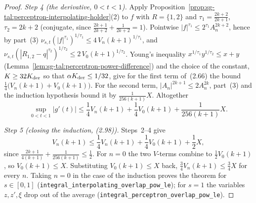 \begin{proof}
\emph{Step 4 (the derivative, $0<t<1$).} Apply Proposition~\ref{prop:sg-tal:perceptron-interpolating-holder}(2) to
$f$ with $R=\{1,2\}$ and $\tau_1=\frac{2k+2}{2k+1}$, $\tau_2=2k+2$ (conjugate, since
$\frac{2k+1}{2k+2}+\frac1{2k+2}=1$). Pointwise $|f|^{\tau_1}\le 2^{\tau_1}A_n^{2k+2}$, hence by part~(3)
$\nu_{s,t}(|f|^{\tau_1})^{1/\tau_1}\le 4\,V_n(k+1)^{1/\tau_1}$, and
$\nu_{s,t}(|R_{1,2}-q|^{\tau_2})^{1/\tau_2}\le 2\,V_0(k+1)^{1/\tau_2}$. Young's inequality
$x^{1/\tau_1}y^{1/\tau_2}\le x+y$ (Lemma~\ref{lem:sg-tal:perceptron-power-difference}) and the choice of the
constant, $K\ge 32K_{\rm der}$ so that $\alpha K_{\rm der}\le 1/32$, give for the first term of~(2.66) the bound
$\tfrac14\bigl(V_n(k+1)+V_0(k+1)\bigr)$. For the second term, $|A_n|^{2k+1}\le 2A_n^{2k}$, part~(3) and the
induction hypothesis bound it by $\tfrac{1}{256(k+1)}X$. Altogether
\[
 \sup_{0<t<1}|g'(t)|\le\frac14V_n(k+1)+\frac14V_0(k+1)+\frac{1}{256(k+1)}X .
\]

\emph{Step 5 (closing the induction, (2.98)).} Steps~2--4 give
\[
 V_n(k+1)\le\frac14V_n(k+1)+\frac14V_0(k+1)+\frac12X,
\]
since $\frac{2k+1}{4(k+1)}+\frac1{256(k+1)}\le\frac12$. For $n=0$ the two $V$-terms combine to $\frac12V_0(k+1)$,
so $V_0(k+1)\le X$. Substituting $V_0(k+1)\le X$ back, $\frac34V_n(k+1)\le\frac34X$ for every $n$. Taking $n=0$ in
the case of the induction proves the theorem for $s\in[0,1]$
(\texttt{integral\_interpolating\_overlap\_pow\_le}); for $s=1$ the variables $z,z',\xi$ drop out of the average
(\texttt{integral\_perceptron\_overlap\_pow\_le}).


\end{proof}
